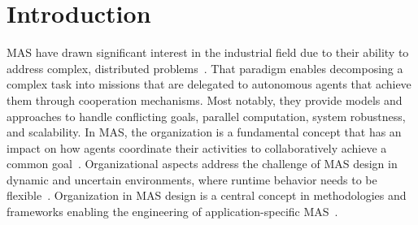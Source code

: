














\section{Introduction}


MAS have drawn significant interest in the industrial field due to their ability to address complex, distributed problems~\cite{Raileanu2023}.
That paradigm enables decomposing a complex task into missions that are delegated to autonomous agents that achieve them through cooperation mechanisms. Most notably, they provide models and approaches to handle conflicting goals, parallel computation, system robustness, and scalability.
In MAS, the organization is a fundamental concept that has an impact on how agents coordinate their activities to collaboratively achieve a common goal~\cite{Hubner2007}.
Organizational aspects address the challenge of MAS design in dynamic and uncertain environments, where runtime behavior needs to be flexible~\cite{Kathleen2020}. Organization in MAS design is a central concept in methodologies and frameworks enabling the engineering of application-specific MAS~\cite{Bakliwal2018}.

